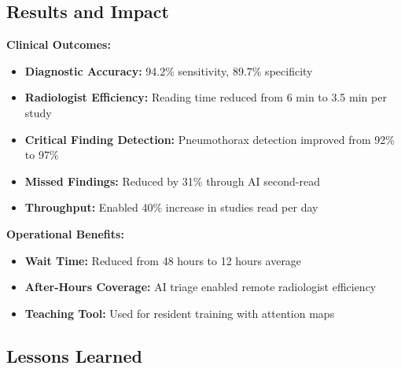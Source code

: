\subsection{Results and Impact}

\textbf{Clinical Outcomes:}

\begin{itemize}
    \item \textbf{Diagnostic Accuracy:} 94.2\% sensitivity, 89.7\% specificity
    \item \textbf{Radiologist Efficiency:} Reading time reduced from 6 min to 3.5 min per study
    \item \textbf{Critical Finding Detection:} Pneumothorax detection improved from 92\% to 97\%
    \item \textbf{Missed Findings:} Reduced by 31\% through AI second-read
    \item \textbf{Throughput:} Enabled 40\% increase in studies read per day
\end{itemize}

\textbf{Operational Benefits:}

\begin{itemize}
    \item \textbf{Wait Time:} Reduced from 48 hours to 12 hours average
    \item \textbf{After-Hours Coverage:} AI triage enabled remote radiologist efficiency
    \item \textbf{Teaching Tool:} Used for resident training with attention maps
\end{itemize}

\subsection{Lessons Learned}

